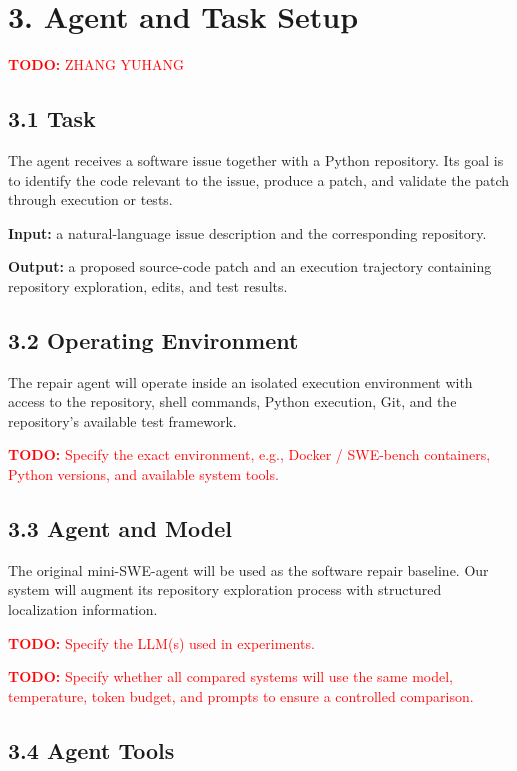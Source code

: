 \documentclass[11pt]{article}
\newcommand{\todo}[1]{%
    \textcolor{red}{\textbf{TODO:} #1}%
}
\begin{document}
\section*{3. Agent and Task Setup}

\todo{ZHANG YUHANG}

\subsection*{3.1 Task}

The agent receives a software issue together with a Python repository.
Its goal is to identify the code relevant to the issue, produce a patch,
and validate the patch through execution or tests.

\textbf{Input:}
a natural-language issue description and the corresponding repository.

\textbf{Output:}
a proposed source-code patch and an execution trajectory containing
repository exploration, edits, and test results.


\subsection*{3.2 Operating Environment}

The repair agent will operate inside an isolated execution environment
with access to the repository, shell commands, Python execution, Git,
and the repository's available test framework.

\todo{Specify the exact environment, e.g., Docker / SWE-bench containers,
Python versions, and available system tools.}


\subsection*{3.3 Agent and Model}

The original mini-SWE-agent will be used as the software repair baseline.
Our system will augment its repository exploration process with structured
localization information.

\todo{Specify the LLM(s) used in experiments.}

\todo{Specify whether all compared systems will use the same model,
temperature, token budget, and prompts to ensure a controlled comparison.}


\subsection*{3.4 Agent Tools}
\end{document}
